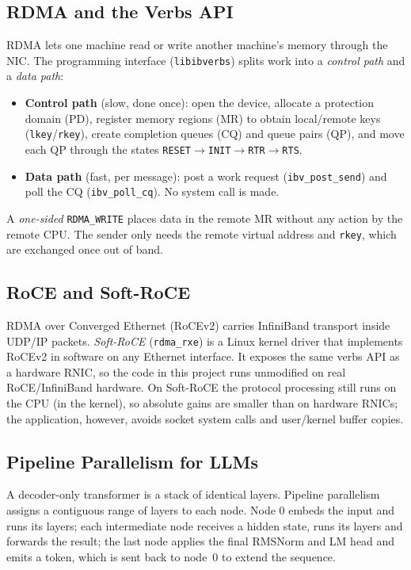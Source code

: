 \documentclass[11pt,a4paper]{article}
\begin{document}
\subsection{RDMA and the Verbs API}
RDMA lets one machine read or write another machine's memory through the NIC. The programming interface (\texttt{libibverbs}) splits work into a \emph{control path} and a \emph{data path}:
\begin{itemize}[leftmargin=*]
  \item \textbf{Control path} (slow, done once): open the device, allocate a protection domain (PD), register memory regions (MR) to obtain local/remote keys (\texttt{lkey}/\texttt{rkey}), create completion queues (CQ) and queue pairs (QP), and move each QP through the states \texttt{RESET}$\rightarrow$\texttt{INIT}$\rightarrow$\texttt{RTR}$\rightarrow$\texttt{RTS}.
  \item \textbf{Data path} (fast, per message): post a work request (\texttt{ibv\_post\_send}) and poll the CQ (\texttt{ibv\_poll\_cq}). No system call is made.
\end{itemize}
A \emph{one-sided} \texttt{RDMA\_WRITE} places data in the remote MR without any action by the remote CPU. The sender only needs the remote virtual address and \texttt{rkey}, which are exchanged once out of band.

\subsection{RoCE and Soft-RoCE}
RDMA over Converged Ethernet (RoCEv2) carries InfiniBand transport inside UDP/IP packets. \emph{Soft-RoCE} (\texttt{rdma\_rxe}) is a Linux kernel driver that implements RoCEv2 in software on any Ethernet interface. It exposes the same verbs API as a hardware RNIC, so the code in this project runs unmodified on real RoCE/InfiniBand hardware. On Soft-RoCE the protocol processing still runs on the CPU (in the kernel), so absolute gains are smaller than on hardware RNICs; the application, however, avoids socket system calls and user/kernel buffer copies.

\subsection{Pipeline Parallelism for LLMs}
A decoder-only transformer is a stack of identical layers. Pipeline parallelism assigns a contiguous range of layers to each node. Node $0$ embeds the input and runs its layers; each intermediate node receives a hidden state, runs its layers and forwards the result; the last node applies the final RMSNorm and LM head and emits a token, which is sent back to node~0 to extend the sequence.
\end{document}
